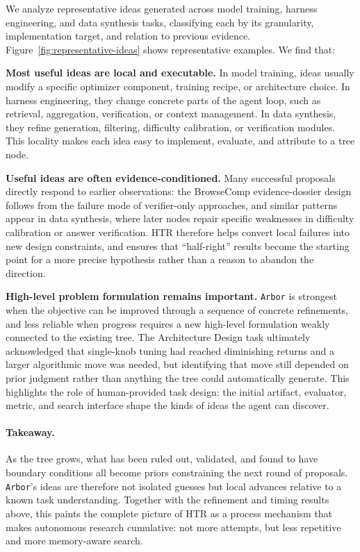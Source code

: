 \documentclass{llmxive}
\providecommand{\arbor}{\texttt{Arbor}}
\begin{document}
We analyze representative ideas generated across model training, harness engineering, and data synthesis tasks, classifying each by its granularity, implementation target, and relation to previous evidence. Figure~\ref{fig:representative-ideas} shows representative examples. We find that:
 
\textbf{Most useful ideas are local and executable.}
In model training, ideas usually modify a specific optimizer component, training recipe, or architecture choice. In harness engineering, they change concrete parts of the agent loop, such as retrieval, aggregation, verification, or context management. In data synthesis, they refine generation, filtering, difficulty calibration, or verification modules. This locality makes each idea easy to implement, evaluate, and attribute to a tree node.
 
\textbf{Useful ideas are often evidence-conditioned.}
Many successful proposals directly respond to earlier observations: the BrowseComp evidence-dossier design follows from the failure mode of verifier-only approaches, and similar patterns appear in data synthesis, where later nodes repair specific weaknesses in difficulty calibration or answer verification. HTR therefore helps convert local failures into new design constraints, and ensures that ``half-right'' results become the starting point for a more precise hypothesis rather than a reason to abandon the direction.
 
\textbf{High-level problem formulation remains important.}
\arbor{} is strongest when the objective can be improved through a sequence of concrete refinements, and less reliable when progress requires a new high-level formulation weakly connected to the existing tree. The Architecture Design task ultimately acknowledged that single-knob tuning had reached diminishing returns and a larger algorithmic move was needed, but identifying that move still depended on prior judgment rather than anything the tree could automatically generate. This highlights the role of human-provided task design: the initial artifact, evaluator, metric, and search interface shape the kinds of ideas the agent can discover.
 
\paragraph{Takeaway.}
As the tree grows, what has been ruled out, validated, and found to have boundary conditions all become priors constraining the next round of proposals.
\arbor{}'s ideas are therefore not isolated guesses but local advances relative to a known task understanding. Together with the refinement and timing results above, this paints the complete picture of HTR as a process mechanism that makes autonomous research cumulative: not more attempts, but less repetitive and more memory-aware search.
 
\end{document}
